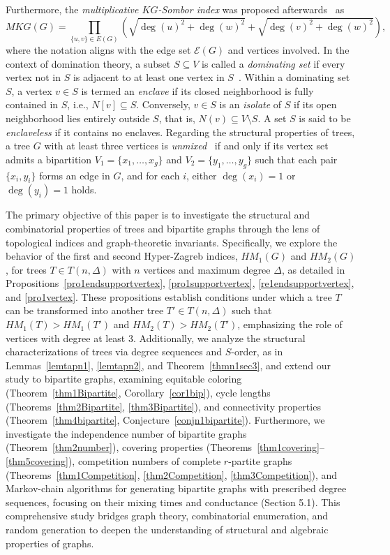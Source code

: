 \documentclass{article}
\theoremstyle{definition}
\begin{document}
Furthermore, the \emph{multiplicative $KG$-Sombor index} was proposed afterwards~\cite{Kulli2022VRv2} as
\begin{equation}\label{eq2Introduction}
MKG(G) = \prod_{\{u,v\} \in E(G)} \left( \sqrt{\deg(u)^2 + \deg(w)^2} + \sqrt{\deg(v)^2 + \deg(w)^2} \right),
\end{equation}
where the notation aligns with the edge set $\mathcal{E}(G)$ and vertices involved. In the context of domination theory, a subset $S \subseteq V$ is called a \emph{dominating set} if every vertex not in $S$ is adjacent to at least one vertex in $S$~\cite{HaynesHeSLa13}. Within a dominating set $S$, a vertex $v \in S$ is termed an \emph{enclave} if its closed neighborhood is fully contained in $S$, i.e., $N[v] \subseteq S$. Conversely, $v \in S$ is an \emph{isolate} of $S$ if its open neighborhood lies entirely outside $S$, that is, $N(v) \subseteq V \setminus S$. A set $S$ is said to be \emph{enclaveless} if it contains no enclaves. Regarding the structural properties of trees, a tree $G$ with at least three vertices is \emph{unmixed}~\cite{Vill2006arreal} if and only if its vertex set admits a bipartition $V_1 = \{x_1, \dots, x_g\}$ and $V_2 = \{y_1, \dots, y_g\}$ such that each pair $\{x_i, y_i\}$ forms an edge in $G$, and for each $i$, either $\deg(x_i) = 1$ or $\deg(y_i) = 1$ holds.



The primary objective of this paper is to investigate the structural and combinatorial properties of trees and bipartite graphs through the lens of topological indices and graph-theoretic invariants. Specifically, we explore the behavior of the first and second Hyper-Zagreb indices, $HM_1(G)$ and $HM_2(G)$, for trees $T \in T(n, \Delta)$ with $n$ vertices and maximum degree $\Delta$, as detailed in Propositions~\ref{pro1endsupportvertex}, \ref{pro1supportvertex}, \ref{re1endsupportvertex}, and \ref{pro1vertex}. These propositions establish conditions under which a tree $T$ can be transformed into another tree $T' \in T(n, \Delta)$ such that $HM_1(T) > HM_1(T')$ and $HM_2(T) > HM_2(T')$, emphasizing the role of vertices with degree at least 3. Additionally, we analyze the structural characterizations of trees via degree sequences and $S$-order, as in Lemmas~\ref{lemtapn1}, \ref{lemtapn2}, and Theorem~\ref{thmn1sec3}, and extend our study to bipartite graphs, examining equitable coloring (Theorem~\ref{thm1Bipartite}, Corollary~\ref{cor1bip}), cycle lengths (Theorems~\ref{thm2Bipartite}, \ref{thm3Bipartite}), and connectivity properties (Theorem~\ref{thm4bipartite}, Conjecture~\ref{conjn1bipartite}). Furthermore, we investigate the independence number of bipartite graphs (Theorem~\ref{thm2number}), covering properties (Theorems~\ref{thm1covering}--\ref{thm5covering}), competition numbers of complete $r$-partite graphs (Theorems~\ref{thm1Competition}, \ref{thm2Competition}, \ref{thm3Competition}), and Markov-chain algorithms for generating bipartite graphs with prescribed degree sequences, focusing on their mixing times and conductance (Section 5.1). This comprehensive study bridges graph theory, combinatorial enumeration, and random generation to deepen the understanding of structural and algebraic properties of graphs.
 
\end{document}
